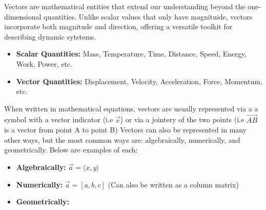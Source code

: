 \documentclass[12.5pt]{article}
\begin{document}
        \begin{flushleft}

            Vectors are mathematical entities that extend our understanding beyond the 
            one-dimensional quantities. Unlike scalar values that only have magnituide, 
            vectors incorporate both magnitude and direction, offering a versatile toolkit
            for describing dynamic sytstems. 

            \begin{itemize}
                \item \textbf{Scalar Quantities:} Mass, Temperature, Time, Distance, Speed, 
                Energy, Work, Power, etc.
                \item \textbf{Vector Quantities:} Displacement, Velocity, Acceleration, 
                Force, Momentum, etc.
            \end{itemize}

            When written in mathematical equations, vectors are usually represented via a a symbol with a vector indicator (i.e $\vec{v}$)
            or via a jointery of the two points (i.e $\vec{AB}$ is a vector from point A to point B) Vectors 
            can also be represented in many other ways, but the most common ways are: algebraically, numerically, 
            and geometrically. Below are examples of each:

            \begin{itemize}

                \item \textbf{Algebraically:} $\vec{a} = \langle x, y \rangle$
                \item  \textbf{Numerically:} $\vec{a} = \left[ a, b, c \right]$ (Can also be written as a column matrix)

                \item { \textbf{Geometrically:} 

                    \begin{center}

                        \begin{tikzpicture}
                        

\end{tikzpicture}
\end{center}}
\end{itemize}
\end{flushleft}
\end{document}
